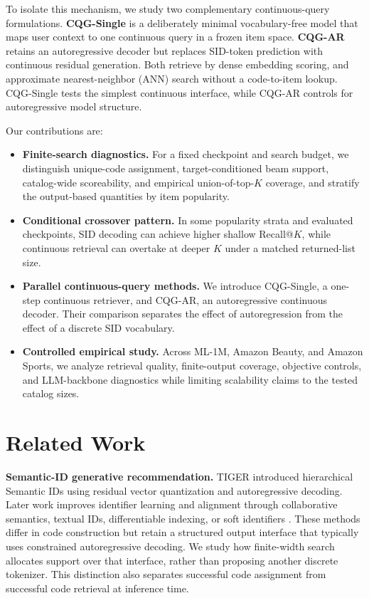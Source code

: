 \documentclass[preprint,12pt]{elsarticle}
\begin{document}
To isolate this mechanism, we study two complementary continuous-query
formulations. \textbf{CQG-Single} is a deliberately minimal vocabulary-free
model that maps user context to one continuous query in a frozen item space.
\textbf{CQG-AR} retains an autoregressive decoder but replaces
SID-token prediction with continuous residual generation.
Both retrieve by dense embedding scoring, and approximate nearest-neighbor (ANN) search without a code-to-item lookup.
CQG-Single tests the simplest continuous interface, while CQG-AR controls for
autoregressive model structure.

Our contributions are:
\begin{itemize}
    \item \textbf{Finite-search diagnostics.} For a fixed checkpoint and search
    budget, we distinguish unique-code assignment, target-conditioned beam
    support, catalog-wide scoreability, and empirical union-of-top-$K$
    coverage, and stratify the output-based quantities by item popularity.
    \item \textbf{Conditional crossover pattern.} In some popularity strata
    and evaluated checkpoints, SID decoding can achieve higher shallow
    Recall@$K$, while continuous retrieval can overtake at deeper $K$ under a
    matched returned-list size.
    \item \textbf{Parallel continuous-query methods.} We introduce CQG-Single, a one-step continuous retriever, and CQG-AR, an autoregressive continuous decoder. Their comparison separates the effect of autoregression from the effect of a discrete SID vocabulary.
    \item \textbf{Controlled empirical study.} Across ML-1M, Amazon Beauty,
    and Amazon Sports, we analyze retrieval quality, finite-output coverage,
    objective controls, and LLM-backbone diagnostics while limiting
    scalability claims to the tested catalog sizes.
\end{itemize}

\section{Related Work}

\textbf{Semantic-ID generative recommendation.}
TIGER \citep{rajput2023tiger} introduced hierarchical Semantic IDs using
residual vector quantization and autoregressive decoding. Later work improves
identifier learning and alignment through collaborative semantics, textual
IDs, differentiable indexing, or soft identifiers
\citep{zheng2024letter,wang2024eager,tan2024idgenrec,fu2026diger,li2026unigrec}.
These methods differ in code construction but retain a structured output
interface that typically uses constrained autoregressive decoding. We study
how finite-width search allocates support over that interface, rather than
proposing another discrete tokenizer. This distinction also separates
successful code assignment from successful code retrieval at inference time.
\end{document}

